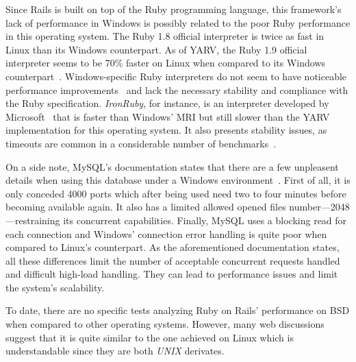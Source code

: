 Since Rails is built on top of the Ruby programming language, this framework's lack of performance in Windows is possibly related to the poor Ruby performance in this operating system. The Ruby 1.8 official interpreter is twice as fast in Linux than its Windows counterpart. As of YARV, the Ruby 1.9 official interpreter seems to be 70\% faster on Linux when compared to its Windows counterpart~\cite{ruby_faster_linux}. Windows-specific Ruby interpreters do not seem to have noticeable performance improvements~\cite{ruby.net} and lack the necessary stability and compliance with the Ruby specification. \textit{IronRuby}, for instance, is an interpreter developed by Microsoft~\cite{ror_ecosystem_whitepaper} that is faster than Windows' MRI but still slower than the YARV implementation for this operating system. It also presents stability issues, as timeouts are common in a considerable number of benchmarks~\cite{ironruby_performance}.

On a side note, MySQL's documentation states that there are a few unpleasent details when using this database under a Windows environment~\cite{mysql_windows_linux}. First of all, it is only conceded 4000 ports which after being used need two to four minutes before becoming available again. It also has a limited allowed opened files number---2048---restraining its concurrent capabilities. Finally, MySQL uses a blocking read for each connection and Windows' connection error handling is quite poor when compared to Linux's counterpart. As the aforementioned documentation states, all these differences limit the number of acceptable concurrent requests handled and difficult high-load handling. They can lead to performance issues and limit the system's scalability.

To date, there are no specific tests analyzing Ruby on Rails' performance on BSD when compared to other operating systems. However, many web discussions suggest that it is quite similar to the one achieved on Linux which is understandable since they are both \textit{UNIX} derivates.

